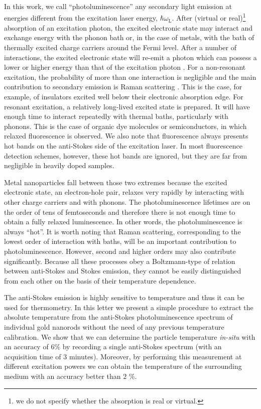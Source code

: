 \documentclass[journal=nalefd,manuscript=letter]{achemso}
\newcommand{\HI}[1]{{#1}} %
\begin{document}
\HI{In this work, we call ``photoluminescence'' any secondary light  emission \cite{orritkottis} at energies
different from the excitation laser energy, $\hbar \omega_\textrm{L}$. After (virtual or 
real)\footnote{we do not specify whether the absorption is real or virtual.} absorption 
of an excitation photon, the excited electronic state \cite{Mooradian1969,Dulkeith2004} 
may interact and exchange energy with the
phonon bath or, in the case of metals, with the bath of thermally excited charge carriers around the
Fermi level. After a number of interactions, the excited electronic state will re-emit a 
photon which can possess a lower or higher energy than that of the excitation photon
\cite{Hodak2000,Giri2015,Arbouet2003a}. For a non-resonant excitation, the probability 
of more than one interaction is negligible and the main contribution to secondary emission 
is Raman scattering \cite{Huang2014}. This is the case, for example, of insulators excited 
well below their electronic absorption edge. For resonant excitation, a relatively long-lived 
excited state is prepared. It will have enough time to interact repeatedly with thermal baths, 
particularly with phonons. This is the case of organic dye molecules or
semiconductors, in which relaxed fluorescence is observed. We also note that fluorescence 
always presents hot bands on the anti-Stokes side of the excitation laser. In most 
fluorescence detection schemes, however, these hot bands are ignored, but they are 
far from negligible in heavily doped samples\cite{Carattino2016a}.}

\HI{Metal nanoparticles fall between those two extremes because the excited electronic state, 
an electron-hole pair, relaxes very rapidly by interacting with other charge carriers and with phonons. 
The photoluminescence lifetimes are on the order of tens of femtoseconds\cite{link1999} and 
therefore there is not enough time to obtain a fully relaxed luminescence. In other words, the 
photoluminescence is always ``hot''. It is worth noting that Raman scattering, 
corresponding to the lowest order of interaction with baths, will be an important
contribution to photoluminescence\cite{Huang2014,mertens2017light}. However, second 
and higher orders may also contribute significantly. Because all these processes obey a 
Boltzmann-type of relation between anti-Stokes and Stokes emission, they cannot be easily 
distinguished from each other on the basis of their temperature dependence.}


\HI{The anti-Stokes emission is highly sensitive to temperature and thus 
it can be used for thermometry\cite{xie2016thermometry}. In this letter we present 
a simple procedure to extract the absolute temperature from the anti-Stokes 
photoluminescence spectrum of individual gold nanorods without the need of 
any previous temperature calibration. We show that we can determine the particle temperature 
\textit{in-situ} with an accuracy of $6\%$ by recording a single anti-Stokes spectrum (with an 
acquisition time of $3$ minutes). 
Moreover, by performing this measurement at different excitation powers 
we can obtain the temperature of the surrounding medium with an accuracy better than $2$ \%.}
\end{document}
